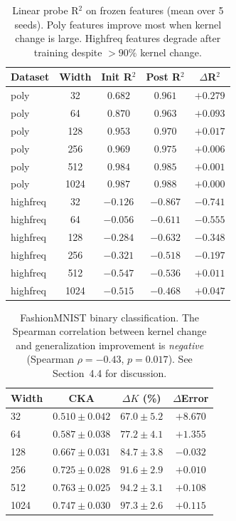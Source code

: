 \documentclass[10pt]{article}
\begin{document}
\begin{table}[htbp]
    \centering\footnotesize
    \setlength{\tabcolsep}{4pt}
    \caption{Linear probe R$^2$ on frozen features (mean over 5 seeds).  Poly features improve most when kernel change is large.  Highfreq features degrade after training despite $>90\%$ kernel change.}
    \label{tab:linear_probe}
    \begin{tabular}{lcccc}
    \toprule
    Dataset & Width & Init R$^2$ & Post R$^2$ & $\Delta$R$^2$ \\
    \midrule
    poly & 32  & $0.682$ & $0.961$ & $+0.279$ \\
    poly & 64  & $0.870$ & $0.963$ & $+0.093$ \\
    poly & 128 & $0.953$ & $0.970$ & $+0.017$ \\
    poly & 256 & $0.969$ & $0.975$ & $+0.006$ \\
    poly & 512 & $0.984$ & $0.985$ & $+0.001$ \\
    poly & 1024 & $0.987$ & $0.988$ & $+0.000$ \\
    \midrule
    highfreq & 32  & $-0.126$ & $-0.867$ & $-0.741$ \\
    highfreq & 64  & $-0.056$ & $-0.611$ & $-0.555$ \\
    highfreq & 128 & $-0.284$ & $-0.632$ & $-0.348$ \\
    highfreq & 256 & $-0.321$ & $-0.518$ & $-0.197$ \\
    highfreq & 512 & $-0.547$ & $-0.536$ & $+0.011$ \\
    highfreq & 1024 & $-0.515$ & $-0.468$ & $+0.047$ \\
    \bottomrule
    \end{tabular}
\end{table}

\begin{table}[h!]  %
    \centering\footnotesize
    \setlength{\tabcolsep}{4pt}
    \caption{FashionMNIST binary classification.  The Spearman correlation between kernel change and generalization improvement is \emph{negative} (Spearman $\rho=-0.43$, $p=0.017$).  See Section~4.4 for discussion.}
    \label{fig:fashion}
    \begin{tabular}{lccc}
    \toprule
    Width & CKA & $\Delta K$ (\%) & $\Delta$Error \\
    \midrule
    32   & $0.510\pm0.042$ & $67.0\pm5.2$  & $+8.670$ \\
    64   & $0.587\pm0.038$ & $77.2\pm4.1$  & $+1.355$ \\
    128  & $0.667\pm0.031$ & $84.7\pm3.8$  & $-0.032$ \\
    256  & $0.725\pm0.028$ & $91.6\pm2.9$  & $+0.010$ \\
    512  & $0.763\pm0.025$ & $94.2\pm3.1$  & $+0.108$ \\
    1024 & $0.747\pm0.030$ & $97.3\pm2.6$  & $+0.115$ \\
    \bottomrule
    \end{tabular}
\end{table}
\end{document}
